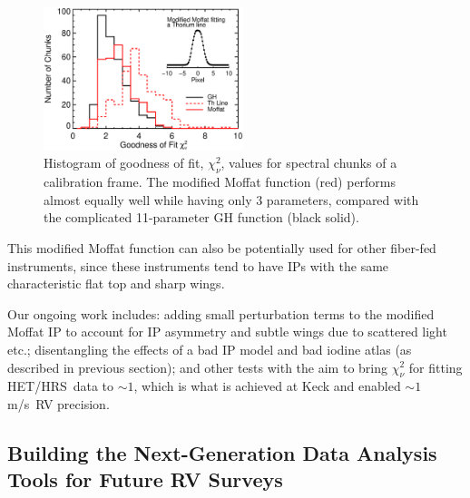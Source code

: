 \documentclass[12pt]{article}
\def\mps{m/s}
\def\hrs{HET/HRS}
\begin{document}
\begin{figure}
  \vspace{-35pt}
  \begin{center}
    \includegraphics[width=0.52\textwidth]{thar_vs_moffat}
  \end{center}
  \vspace{-25pt}  
  \caption{Histogram of goodness of fit, $\chi_\nu^2$, values for
    spectral chunks of a calibration frame. The modified Moffat
    function (red) performs almost equally well while having only 3
    parameters, compared with the complicated 11-parameter GH function
    (black solid).} 
  \vspace{-8pt}  
  \label{fig:ip}
\end{figure}


This modified Moffat function can also be potentially used for other
fiber-fed instruments, since these instruments tend to have IPs with
the same characteristic flat top and sharp wings.

Our ongoing work includes: adding small perturbation terms to the
modified Moffat IP to account for IP asymmetry and subtle wings due to
scattered light etc.; disentangling the effects of a bad IP model and
bad iodine atlas (as described in previous section); and other tests
with the aim to bring $\chi^2_\nu$ for fitting \hrs\ data to $\sim 1$,
which is what is achieved at Keck and enabled $\sim 1$ \mps\ RV
precision.



\vspace{-10pt}
\subsection{Building the Next-Generation Data Analysis Tools for Future RV Surveys}\label{sec:newrv}
\vspace{-5pt}
\end{document}
